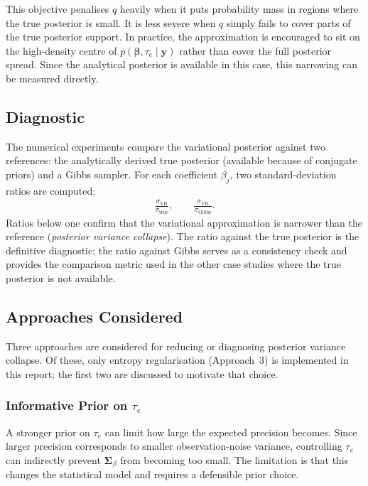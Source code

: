 \documentclass[11pt,a4paper]{article}
\begin{document}
This objective penalises $q$ heavily when it puts probability mass in regions where the true posterior is small. It is less severe when $q$ simply fails to cover parts of the true posterior support. In practice, the approximation is encouraged to sit on the high-density centre of $p(\bm{\beta},\tau_e\mid\bm{y})$ rather than cover the full posterior spread. Since the analytical posterior is available in this case, this narrowing can be measured directly.

\subsection{Diagnostic}

The numerical experiments compare the variational posterior against two references: the analytically derived true posterior (available because of conjugate priors) and a Gibbs sampler. For each coefficient $\beta_j$, two standard-deviation ratios are computed:
\begin{align}
\frac{\sigma_{\mathrm{VB}}}{\sigma_{\mathrm{true}}}, \qquad \frac{\sigma_{\mathrm{VB}}}{\sigma_{\mathrm{Gibbs}}}.
\end{align}
Ratios below one confirm that the variational approximation is narrower than the reference (\emph{posterior variance collapse}). The ratio against the true posterior is the definitive diagnostic; the ratio against Gibbs serves as a consistency check and provides the comparison metric used in the other case studies where the true posterior is not available.

\subsection{Approaches Considered}

Three approaches are considered for reducing or diagnosing posterior variance collapse. Of these, only entropy regularisation (Approach~3) is implemented in this report; the first two are discussed to motivate that choice.

\subsubsection{Informative Prior on $\tau_e$}

A stronger prior on $\tau_e$ can limit how large the expected precision becomes. Since larger precision corresponds to smaller observation-noise variance, controlling $\tau_e$ can indirectly prevent $\bm{\Sigma}_\beta$ from becoming too small. The limitation is that this changes the statistical model and requires a defensible prior choice.
\end{document}
